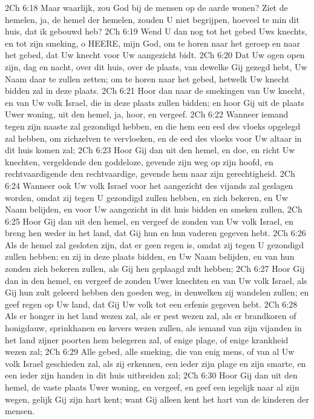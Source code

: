 2Ch 6:18  Maar waarlijk, zou God bij de mensen op de aarde wonen? Ziet de hemelen, ja, de hemel der hemelen, zouden U niet begrijpen, hoeveel te min dit huis, dat ik gebouwd heb?
2Ch 6:19  Wend U dan nog tot het gebed Uws knechts, en tot zijn smeking, o HEERE, mijn God, om te horen naar het geroep en naar het gebed, dat Uw knecht voor Uw aangezicht bidt.
2Ch 6:20  Dat Uw ogen open zijn, dag en nacht, over dit huis, over de plaats, van dewelke Gij gezegd hebt, Uw Naam daar te zullen zetten; om te horen naar het gebed, hetwelk Uw knecht bidden zal in deze plaats.
2Ch 6:21  Hoor dan naar de smekingen van Uw knecht, en van Uw volk Israel, die in deze plaats zullen bidden; en hoor Gij uit de plaats Uwer woning, uit den hemel, ja, hoor, en vergeef.
2Ch 6:22  Wanneer iemand tegen zijn naaste zal gezondigd hebben, en die hem een eed des vloeks opgelegd zal hebben, om zichzelven te vervloeken, en de eed des vloeks voor Uw altaar in dit huis komen zal;
2Ch 6:23  Hoor Gij dan uit den hemel, en doe, en richt Uw knechten, vergeldende den goddeloze, gevende zijn weg op zijn hoofd, en rechtvaardigende den rechtvaardige, gevende hem naar zijn gerechtigheid.
2Ch 6:24  Wanneer ook Uw volk Israel voor het aangezicht des vijands zal geslagen worden, omdat zij tegen U gezondigd zullen hebben, en zich bekeren, en Uw Naam belijden, en voor Uw aangezicht in dit huis bidden en smeken zullen,
2Ch 6:25  Hoor Gij dan uit den hemel, en vergeef de zonden van Uw volk Israel, en breng hen weder in het land, dat Gij hun en hun vaderen gegeven hebt.
2Ch 6:26  Als de hemel zal gesloten zijn, dat er geen regen is, omdat zij tegen U gezondigd zullen hebben; en zij in deze plaats bidden, en Uw Naam belijden, en van hun zonden zich bekeren zullen, als Gij hen geplaagd zult hebben;
2Ch 6:27  Hoor Gij dan in den hemel, en vergeef de zonden Uwer knechten en van Uw volk Israel, als Gij hun zult geleerd hebben den goeden weg, in denwelken zij wandelen zullen; en geef regen op Uw land, dat Gij Uw volk tot een erfenis gegeven hebt.
2Ch 6:28  Als er honger in het land wezen zal, als er pest wezen zal, als er brandkoren of honigdauw, sprinkhanen en kevers wezen zullen, als iemand van zijn vijanden in het land zijner poorten hem belegeren zal, of enige plage, of enige krankheid wezen zal;
2Ch 6:29  Alle gebed, alle smeking, die van enig mens, of van al Uw volk Israel geschieden zal, als zij erkennen, een ieder zijn plage en zijn smarte, en een ieder zijn handen in dit huis uitbreiden zal;
2Ch 6:30  Hoor Gij dan uit den hemel, de vaste plaats Uwer woning, en vergeef, en geef een iegelijk naar al zijn wegen, gelijk Gij zijn hart kent; want Gij alleen kent het hart van de kinderen der mensen.
